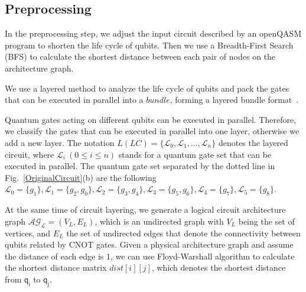 \documentclass[journal]{IEEEtran}
\begin{document}
\subsection{Preprocessing}
In the preprocessing step, we adjust the input circuit described by an openQASM program to shorten the life cycle of qubits. Then we use a Breadth-First Search (BFS) to calculate the shortest distance between each pair of nodes on the architecture graph.

We use a layered method to analyze the life cycle of qubits and pack the gates that can be executed in parallel into a $bundle$, forming a layered bundle format~\cite{2019Zhang}.

Quantum gates acting on different qubits can be executed in parallel. Therefore, we classify the gates that can be executed in parallel into one layer, otherwise we add a new layer. The notation $L(LC)=\{\mathcal{L}_{0},\mathcal{L}_{1},...,\mathcal{L}_{n}\}$ denotes the layered circuit, where $\mathcal{L}_{i} \ (0 \le i \le n) $ stands for a quantum gate set that can be executed in parallel. The quantum gate set separated by the dotted line in Fig.~\ref{OriginalCircuit}(b) are the following $\mathcal{L}_{0}=\{g_{1}\},\mathcal{L}_{1}=\{g_{2},g_{0}\},
\mathcal{L}_{2}=\{g_{3},g_{4}\},\mathcal{L}_{3}=\{g_{5},g_{6}\},\mathcal{L}_{4}=\{g_{7}\},\mathcal{L}_{5}=\{g_{8}\}$.

At the same time of circuit layering, we generate a logical circuit architecture graph $\mathcal{AG_{L}}=(V_{L},E_{L})$, which is an undirected graph with $V_{L}$ being the set of vertices, and $E_{L}$  the set of undirected edges that denote the connectivity between qubits related by CNOT gates.
Given a physical architecture graph and assume the distance of each edge is 1, we can use Floyd-Warshall algorithm to calculate the shortest distance matrix $dist[i][j]$, which denotes the shortest distance from $\textsf{q}_{\textsf{i}}$ to $\textsf{q}_{\textsf{j}}$. 
\end{document}
